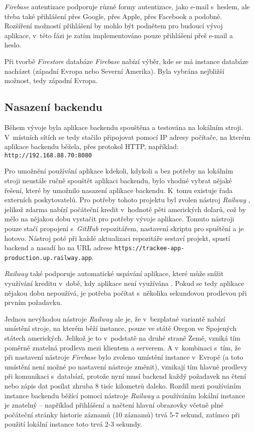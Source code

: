 \emph{Firebase} autentizace podporuje různé formy autentizace, jako e-mail s~heslem, ale třeba také přihlášení přes Google, přes Apple, přes Facebook a podobně. Rozšíření možností přihlášení by mohlo být podnětem pro budoucí vývoj aplikace, v~této fázi je zatím implementováno pouze přihlášení přeš e-mail a heslo. 

Při tvorbě \emph{Firestore} databáze \emph{Firebase} nabízí výběr, kde se má instance databáze nacházet (západní Evropa nebo Severní Amerika). Byla vybrána nejbližší možnost, tedy západní Evropa.

\subsection{Nasazení backendu}

Během vývoje byla aplikace backendu spouštěna a testována na lokálním stroji. V~místních sítích se tedy stačilo připojovat pomocí IP adresy počítače, na kterém aplikace backendu běžela, přes protokol HTTP, například: \texttt{http://192.168.88.70:8080}

Pro umožnění používání aplikace kdekoli, kdykoli a bez potřeby na lokálním stroji neustále ručně spouštět aplikaci backendu, bylo vhodné vybrat nějaké řešení, které by umožnilo nasazení aplikace backendu. K~tomu existuje řada externích poskytovatelů. Pro potřeby tohoto projektu byl zvolen nástroj \emph{Railway} \cite{railway}, jelikož zdarma nabízí počáteční kredit v~hodnotě pěti amerických dolarů, což by mělo na nějakou dobu vystačit pro potřeby vývoje aplikace. Tomuto nástroji pouze stačí propojení s~\emph{GitHub} repozitářem, nastavení skriptu pro spuštění a je hotovo. Nástroj poté při každé aktualizaci repozitáře sestaví projekt, spustí backend a nasadí ho na URL adrese \texttt{https://trackee-app-production.up.railway.app}. 

\emph{Railway} také podporuje automatické uspávání aplikace, které může snížit využívání kreditu v~době, kdy aplikace není využívána \cite{railway-app-sleeping}. Pokud se tedy aplikace nějakou dobu nepoužívá, je potřeba počítat s~několika sekundovou prodlevou při prvním požadavku.

Jednou nevýhodou nástroje \emph{Railway} ale je, že v~bezplatné variantě nabízí umístění stroje, na kterém běží instance, pouze ve státě Oregon ve Spojených státech amerických. Jelikož je to v~podstatě na druhé straně Země, vzniká tím poměrně znatelná prodleva mezi klientem a serverem. A v~kombinaci s~tím, že při nastavení nástroje \emph{Firebase} bylo zvoleno umístění instance v~Evropě (a toto umístění není možné po nastavení nástroje změnit), vznikají tím hlavně prodlevy při komunikaci s~databází, protože nyní musí backend každý požadavek na čtení nebo zápis dat posílat zhruba 8 tisíc kilometrů daleko. Rozdíl mezi používáním instance backendu běžící pomocí nástroje \emph{Railway} a používáním lokální instance je znatelný – například přihlášení a načtení hlavní obrazovky včetně plné počáteční stránky historie záznamů (10 záznamů) trvá 5-7 sekund, zatímco při použití lokální instance toto trvá 2-3 sekundy.

